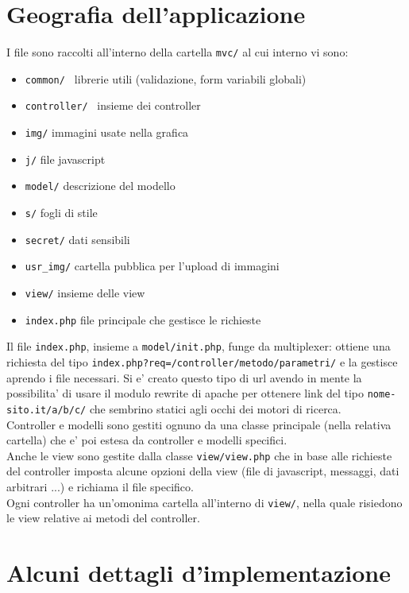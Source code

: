 \documentclass{article}
\begin{document}
\section{Geografia dell'applicazione}
I file sono raccolti all'interno della cartella \texttt{mvc/} al cui interno vi sono:
\begin{itemize}
\item \texttt{common/ } librerie utili (validazione, form variabili globali)
\item \texttt{controller/ } insieme dei controller
\item \texttt{img/} immagini usate nella grafica
\item \texttt{j/} file javascript
\item \texttt{model/} descrizione del modello
\item \texttt{s/} fogli di stile
\item \texttt{secret/} dati sensibili
\item \texttt{usr\_img/} cartella pubblica per l'upload di immagini
\item \texttt{view/} insieme delle view
\item \texttt{index.php} file principale che gestisce le richieste

\end{itemize}

Il file \texttt{index.php}, insieme a \texttt{model/init.php}, funge da multiplexer: ottiene una richiesta del tipo \texttt{index.php?req=/controller/metodo/parametri/} e la gestisce aprendo i file necessari. Si e' creato questo tipo di url avendo in mente la possibilita' di usare il modulo rewrite di apache per ottenere link del tipo \texttt{nome-sito.it/a/b/c/} che sembrino statici agli occhi dei motori di ricerca.
\\
Controller e modelli sono gestiti ognuno da una classe principale (nella relativa cartella) che e' poi estesa da controller e modelli specifici.
\\
Anche le view sono gestite dalla classe \texttt{view/view.php} che in base alle richieste del controller imposta alcune opzioni della view (file di javascript, messaggi, dati arbitrari ...) e richiama il file specifico.
\\
Ogni controller ha un'omonima cartella all'interno di \texttt{view/}, nella quale risiedono le view relative ai metodi del controller.

\section{Alcuni dettagli d'implementazione}
\end{document}

